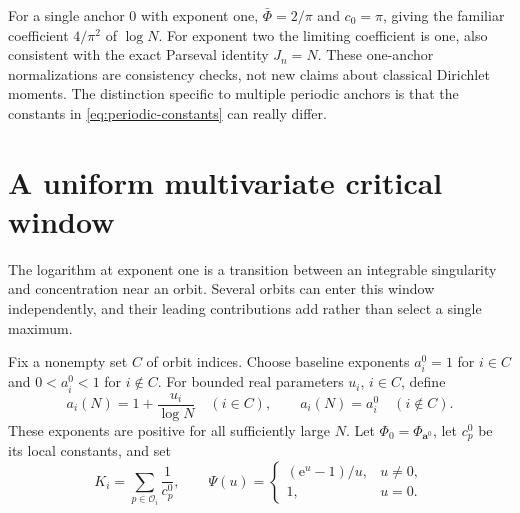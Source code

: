 \documentclass[11pt,a4paper]{article}
\numberwithin{equation}{section}
\theoremstyle{definition}
\theoremstyle{remark}
\newcommand{\ee}{\mathrm e}
\newcommand{\cO}{\mathcal O}
\begin{document}
For a single anchor $0$ with exponent one, $\bar\Phi=2/\pi$ and
$c_0=\pi$, giving the familiar coefficient $4/\pi^2$ of $\log N$.
For exponent two the limiting coefficient is one, also consistent
with the exact Parseval identity $J_n=N$. These one-anchor
normalizations are consistency checks, not new claims about classical
Dirichlet moments. The distinction specific to multiple periodic
anchors is that the constants in \cref{eq:periodic-constants} can
really differ.

\section{A uniform multivariate critical window}
\label{sec:crossover}
The logarithm at exponent one is a transition between an integrable
singularity and concentration near an orbit. Several orbits can enter
this window independently, and their leading contributions add rather
than select a single maximum.

Fix a nonempty set $C$ of orbit indices. Choose baseline exponents
$a_i^0=1$ for $i\in C$ and $0<a_i^0<1$ for $i\notin C$. For bounded
real parameters $u_i$, $i\in C$, define
\begin{equation}
 a_i(N)=1+\frac{u_i}{\log N}\quad(i\in C),
 \qquad a_i(N)=a_i^0\quad(i\notin C).
 \label{eq:critical-window}
\end{equation}
These exponents are positive for all sufficiently large $N$.
Let $\Phi_0=\Phi_{\boldsymbol a^0}$, let $c_p^0$ be its local
constants, and set
\begin{equation}
 K_i=\sum_{p\in\cO_i}\frac1{c_p^0},\qquad
 \Psi(u)=\begin{cases}(\ee^u-1)/u,&u\ne0,\\1,&u=0.\end{cases}
 \label{eq:critical-data}
\end{equation}
\end{document}

